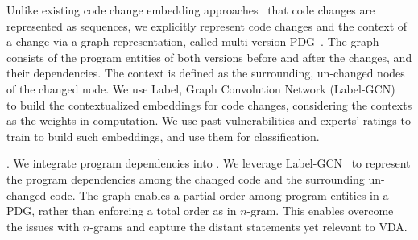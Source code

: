 Unlike existing code change embedding
approaches~\cite{cc2vec,commit2vec} that code changes are represented
as sequences, we explicitly represent code changes and the
context of a change via a graph representation, called multi-version
PDG~\cite{flexeme-fse20}. The graph consists of
the program entities of both versions before and after the changes,
and their dependencies. The context is defined as the surrounding,
un-changed nodes of the changed node.
%
We use Label, Graph Convolution Network (Label-GCN)~\cite{label-gcn}
to build the contextualized embeddings for code changes, considering
the contexts as the weights in computation.
%
We use past vulnerabilities and experts' ratings to train {\tool}
to build such embeddings, and use them for classification.
%



\vspace{1pt}
.
We integrate program dependencies into {\tool}. We leverage
Label-GCN~\cite{label-gcn} to represent the program dependencies among
the changed code and the surrounding un-changed code.
%
The graph enables a partial order among program entities in a PDG,
rather than enforcing a total order as in $n$-gram.
%
This enables {\tool} overcome the issues with $n$-grams and capture
the distant statements yet relevant to VDA.





